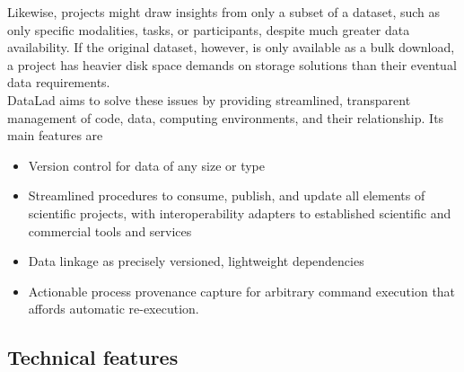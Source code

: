 {Likewise, projects might draw insights from only a subset of a dataset, such as only specific modalities, tasks, or participants, despite much greater data availability.
If the original dataset, however, is only available as a bulk download, a project has heavier disk space demands on storage solutions than their eventual data requirements.\\
DataLad aims to solve these issues by providing streamlined, transparent management of code, data, computing environments, and their relationship.
Its main features are
\begin{itemize}
	\item Version control for data of any size or type
	\item Streamlined procedures to consume, publish, and update  all elements of scientific projects, with interoperability adapters to established scientific and commercial tools and services
	\item Data linkage as precisely versioned, lightweight dependencies
	\item Actionable process provenance capture for arbitrary command execution that affords automatic re-execution.
\end{itemize}

\subsection{Technical features}

}
